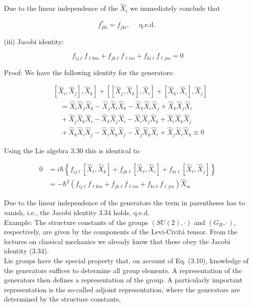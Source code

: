 \documentclass[10pt, letterpaper]{article}
\begin{document}
Due to the linear independence of the $\hat{X}_{i}$ we immediately conclude that

$$
f_{j k i}^{*}=f_{j k i}, \quad \text { q.e.d. }
$$

(iii) Jacobi identity:

$$
f_{i j \ell} f_{\ell k m}+f_{j k \ell} f_{\ell i m}+f_{k i \ell} f_{\ell j m}=0
$$

Proof: We have the following identity for the generators:

$$
\begin{aligned}
& \left.\left.\left[\hat{X}_{i}, \hat{X}_{j}\right], \hat{X}_{k}\right]+\left[\left[\hat{X}_{j}, \hat{X}_{k}\right], \hat{X}_{i}\right]+\left[\hat{X}_{k}, \hat{X}_{i}\right], \hat{X}_{j}\right] \\
& \quad=\hat{X}_{i} \hat{X}_{j} \hat{X}_{k}-\hat{X}_{j} \hat{X}_{i} \hat{X}_{k}-\hat{X}_{k} \hat{X}_{i} \hat{X}_{j}+\hat{X}_{k} \hat{X}_{j} \hat{X}_{i} \\
& \quad+\hat{X}_{j} \hat{X}_{k} \hat{X}_{i}-\hat{X}_{k} \hat{X}_{j} \hat{X}_{i}-\hat{X}_{i} \hat{X}_{j} \hat{X}_{k}+\hat{X}_{i} \hat{X}_{k} \hat{X}_{j} \\
& \quad+\hat{X}_{k} \hat{X}_{i} \hat{X}_{j}-\hat{X}_{i} \hat{X}_{k} \hat{X}_{j}-\hat{X}_{j} \hat{X}_{k} \hat{X}_{i}+\hat{X}_{j} \hat{X}_{i} \hat{X}_{k} \equiv 0
\end{aligned}
$$

Using the Lie algebra 3.30 this is identical to

$$
\begin{aligned}
0 & =i \hbar\left\{f_{i j \ell}\left[\hat{X}_{\ell}, \hat{X}_{k}\right]+f_{j k \ell}\left[\hat{X}_{\ell}, \hat{X}_{i}\right]+f_{k i \ell}\left[\hat{X}_{\ell}, \hat{X}_{j}\right]\right\} \\
& =-\hbar^{2}\left(f_{i j \ell} f_{\ell k m}+f_{j k \ell} f_{\ell i m}+f_{k i \ell} f_{\ell j m}\right) \hat{X}_{m}
\end{aligned}
$$

Due to the linear independence of the generators the term in parentheses has to vanish, i.e., the Jacobi identity 3.34 holds, q.e.d.\\
Example: The structure constants of the groups $(S U(2), \cdot)$ and $\left(G_{R}, \cdot\right)$, respectively, are given by the components of the Levi-Civitá tensor. From the lectures on classical mechanics we already know that these obey the Jacobi identity (3.34).\\
Lie groups have the special property that, on account of Eq. (3.10), knowledge of the generators suffices to determine all group elements. A representation of the generators then defines a representation of the group. A particularly important representation is the so-called adjoint representation, where the generators are determined by the structure constants,
\end{document}
